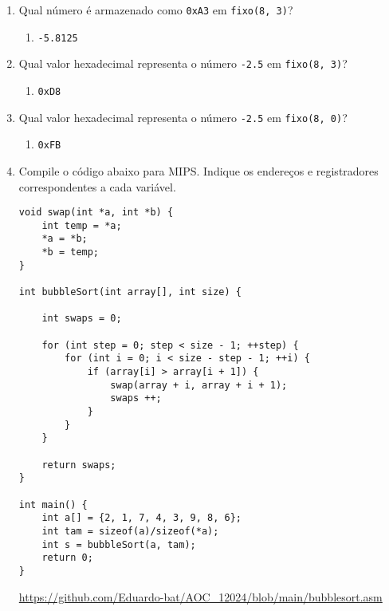 \documentclass{article}
\begin{document}
\begin{enumerate}
\begin{spacing}{1.5}
\begin{enumerate}
\end{enumerate}
\end{spacing}
\bigskip

\item \large Qual número é armazenado como \verb|0xA3| em \verb|fixo(8, 3)|?

\smallskip

\iffalse
10100011 = -93
-93/16=-5.8125
\fi

\begin{enumerate}
\item \verb|-5.8125|%
\end{enumerate}

\bigskip

\item \large Qual valor hexadecimal representa o número \verb|-2.5| em \verb|fixo(8, 3)|?

\smallskip

\iffalse
2.5 = 0010.1000
      1101.0111
-2.5= 1101.1000
\fi

\begin{enumerate}
\item \verb|0xD8|%
\end{enumerate}

\item \large Qual valor hexadecimal representa o número \verb|-2.5| em \verb|fixo(8, 0)|?

\smallskip

\begin{enumerate}
\item \verb|0xFB|%
\end{enumerate}

\pagebreak

\item \large Compile o código abaixo para MIPS. Indique os endereços e registradores correspondentes a cada variável.

\begin{lstlisting}[frame=single]
void swap(int *a, int *b) {
    int temp = *a;
    *a = *b;
    *b = temp;
}

int bubbleSort(int array[], int size) {

    int swaps = 0;

    for (int step = 0; step < size - 1; ++step) {
        for (int i = 0; i < size - step - 1; ++i) {
            if (array[i] > array[i + 1]) {
                swap(array + i, array + i + 1);
                swaps ++;
            }
        }
    }

    return swaps;
}

int main() {
    int a[] = {2, 1, 7, 4, 3, 9, 8, 6};
    int tam = sizeof(a)/sizeof(*a);
    int s = bubbleSort(a, tam);
    return 0;
}

\end{lstlisting}

\url{https://github.com/Eduardo-bat/AOC_12024/blob/main/bubblesort.asm}

\end{enumerate}
\end{document}
